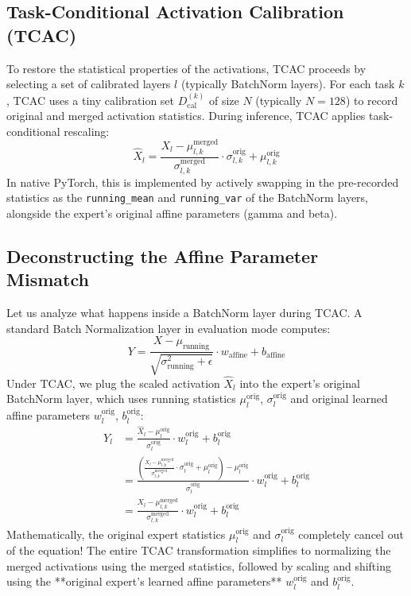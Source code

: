 \documentclass{article}
\theoremstyle{plain}
\theoremstyle{definition}
\theoremstyle{remark}
\begin{document}
\subsection{Task-Conditional Activation Calibration (TCAC)}
To restore the statistical properties of the activations, TCAC proceeds by selecting a set of calibrated layers $l$ (typically BatchNorm layers). For each task $k$, TCAC uses a tiny calibration set $D_{\text{cal}}^{(k)}$ of size $N$ (typically $N=128$) to record original and merged activation statistics. During inference, TCAC applies task-conditional rescaling:
\begin{equation}
\hat{X}_l = \frac{X_l - \mu_{l,k}^{\text{merged}}}{\sigma_{l,k}^{\text{merged}}} \cdot \sigma_{l,k}^{\text{orig}} + \mu_{l,k}^{\text{orig}}
\end{equation}
In native PyTorch, this is implemented by actively swapping in the pre-recorded statistics as the \texttt{running\_mean} and \texttt{running\_var} of the BatchNorm layers, alongside the expert's original affine parameters (gamma and beta).

\subsection{Deconstructing the Affine Parameter Mismatch}
Let us analyze what happens inside a BatchNorm layer during TCAC. A standard Batch Normalization layer in evaluation mode computes:
\begin{equation}
Y = \frac{X - \mu_{\text{running}}}{\sqrt{\sigma^2_{\text{running}} + \epsilon}} \cdot w_{\text{affine}} + b_{\text{affine}}
\end{equation}
Under TCAC, we plug the scaled activation $\hat{X}_l$ into the expert's original BatchNorm layer, which uses running statistics $\mu_l^{\text{orig}}$, $\sigma_l^{\text{orig}}$ and original learned affine parameters $w_l^{\text{orig}}$, $b_l^{\text{orig}}$:
\begin{align}
Y_l &= \frac{\hat{X}_l - \mu_l^{\text{orig}}}{\sigma_l^{\text{orig}}} \cdot w_l^{\text{orig}} + b_l^{\text{orig}} \nonumber \\
&= \frac{\left( \frac{X_l - \mu_{l,k}^{\text{merged}}}{\sigma_{l,k}^{\text{merged}}} \cdot \sigma_l^{\text{orig}} + \mu_l^{\text{orig}} \right) - \mu_l^{\text{orig}}}{\sigma_l^{\text{orig}}} \cdot w_l^{\text{orig}} + b_l^{\text{orig}} \nonumber \\
&= \frac{X_l - \mu_{l,k}^{\text{merged}}}{\sigma_{l,k}^{\text{merged}}} \cdot w_l^{\text{orig}} + b_l^{\text{orig}}
\end{align}
Mathematically, the original expert statistics $\mu_l^{\text{orig}}$ and $\sigma_l^{\text{orig}}$ completely cancel out of the equation! The entire TCAC transformation simplifies to normalizing the merged activations using the merged statistics, followed by scaling and shifting using the **original expert's learned affine parameters** $w_l^{\text{orig}}$ and $b_l^{\text{orig}}$.
\end{document}
